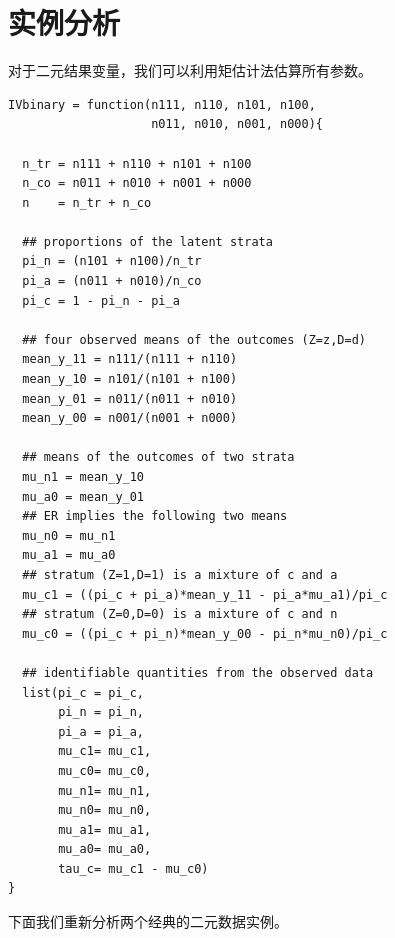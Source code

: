 \section{实例分析}\label{section::binary-y-ivineq}


对于二元结果变量，我们可以利用矩估计法估算所有参数。


\begin{lstlisting}
IVbinary = function(n111, n110, n101, n100, 
                    n011, n010, n001, n000){
  
  n_tr = n111 + n110 + n101 + n100
  n_co = n011 + n010 + n001 + n000
  n    = n_tr + n_co
  
  ## proportions of the latent strata
  pi_n = (n101 + n100)/n_tr
  pi_a = (n011 + n010)/n_co
  pi_c = 1 - pi_n - pi_a
  
  ## four observed means of the outcomes (Z=z,D=d)
  mean_y_11 = n111/(n111 + n110)
  mean_y_10 = n101/(n101 + n100)
  mean_y_01 = n011/(n011 + n010)
  mean_y_00 = n001/(n001 + n000)
  
  ## means of the outcomes of two strata
  mu_n1 = mean_y_10
  mu_a0 = mean_y_01
  ## ER implies the following two means
  mu_n0 = mu_n1
  mu_a1 = mu_a0
  ## stratum (Z=1,D=1) is a mixture of c and a
  mu_c1 = ((pi_c + pi_a)*mean_y_11 - pi_a*mu_a1)/pi_c
  ## stratum (Z=0,D=0) is a mixture of c and n
  mu_c0 = ((pi_c + pi_n)*mean_y_00 - pi_n*mu_n0)/pi_c
  
  ## identifiable quantities from the observed data
  list(pi_c = pi_c, 
       pi_n = pi_n, 
       pi_a = pi_a, 
       mu_c1= mu_c1,
       mu_c0= mu_c0,
       mu_n1= mu_n1,
       mu_n0= mu_n0,
       mu_a1= mu_a1,
       mu_a0= mu_a0,
       tau_c= mu_c1 - mu_c0)
}
\end{lstlisting}


下面我们重新分析两个经典的二元数据实例。 

